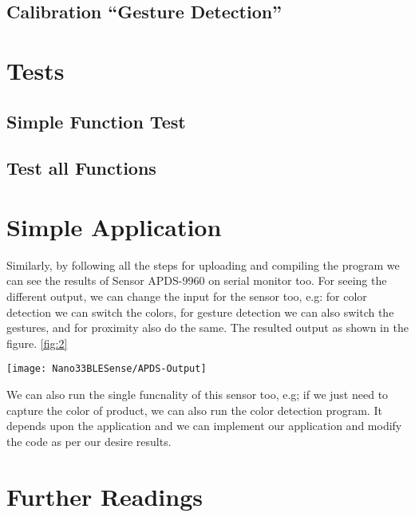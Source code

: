
\subsection{Calibration ``Gesture Detection''}




\section{Tests}

\subsection{Simple Function Test}

\subsection{Test all Functions}

\section{Simple Application}

Similarly, by following all the steps for uploading and compiling the program we can see the results of Sensor APDS-9960  on serial monitor too. For seeing the different output, we can change the input for the sensor too, e.g: for color detection we can switch the colors, for gesture detection we can also switch the gestures, and for proximity also do the same. The resulted output as shown in the figure.  \ref{fig:2} 

\begin{center}
    \texttt{[image: Nano33BLESense/APDS-Output]}
    \label{fig:2}
\end{center}

We can also run the single funcnality of this sensor too, e.g; if we just need to capture the color of product, we can also run the color detection program. It depends upon the application and we can implement our application and modify the code as per our desire results.


{
    \label{TestAPDS9960}
}







\section{Further Readings}




 










